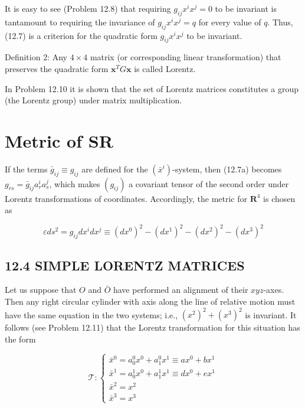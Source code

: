 \documentclass[10pt]{article}
\begin{document}
It is easy to see (Problem 12.8) that requiring $g_{i j} x^{i} x^{j}=0$ to be invariant is tantamount to requiring the invariance of $g_{i j} x^{i} x^{j}=q$ for every value of $q$. Thus, (12.7) is a criterion for the quadratic form $g_{i j} x^{i} x^{j}$ to be invariant.

Definition 2: Any $4 \times 4$ matrix (or corresponding linear transformation) that preserves the quadratic form $\mathbf{x}^{T} G \mathbf{x}$ is called Lorentz.

In Problem 12.10 it is shown that the set of Lorentz matrices constitutes a group (the Lorentz group) under matrix multiplication.

\section*{Metric of SR}
If the terms $\bar{g}_{i j} \equiv g_{i j}$ are defined for the $\left(\bar{x}^{i}\right)$-system, then (12.7a) becomes $g_{r s}=\bar{g}_{i j} a_{r}^{i} a_{s}^{j}$, which makes $\left(g_{i j}\right)$ a covariant tensor of the second order under Lorentz transformations of coordinates. Accordingly, the metric for $\mathbf{R}^{4}$ is chosen as


\begin{equation*}
\varepsilon d s^{2}=g_{i j} d x^{i} d x^{j} \equiv\left(d x^{0}\right)^{2}-\left(d x^{1}\right)^{2}-\left(d x^{2}\right)^{2}-\left(d x^{3}\right)^{2} \tag{12.8}
\end{equation*}


\subsection*{12.4 SIMPLE LORENTZ MATRICES}
Let us suppose that $O$ and $\bar{O}$ have performed an alignment of their $x y z$-axes. Then any right circular cylinder with axis along the line of relative motion must have the same equation in the two systems; i.e., $\left(x^{2}\right)^{2}+\left(x^{3}\right)^{2}$ is invariant. It follows (see Problem 12.11) that the Lorentz transformation for this situation has the form

\[
\mathscr{T}:\left\{\begin{array}{l}
\bar{x}^{0}=a_{0}^{0} x^{0}+a_{1}^{0} x^{1} \equiv a x^{0}+b x^{1}  \tag{12.9}\\
\bar{x}^{1}=a_{0}^{1} x^{0}+a_{1}^{1} x^{1} \equiv d x^{0}+e x^{1} \\
\bar{x}^{2}=x^{2} \\
\bar{x}^{3}=x^{3}
\end{array}\right.
\]
\end{document}
